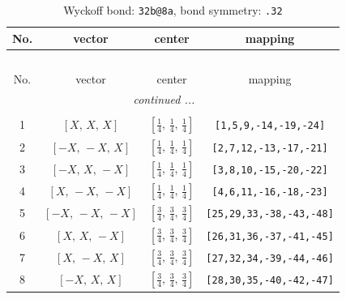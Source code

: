 \documentclass[fleqn,8pt]{jsarticle}
\begin{document}
\renewcommand{\arraystretch}{1.2}
\begin{longtable}{cccc}
\caption{Wyckoff bond: {\tt 32b@8a}, bond symmetry: {\tt .32}}
 \\
 \hline \hline
No. & vector & center & mapping \\ \hline \endfirsthead

\multicolumn{3}{l}{\tablename\ \thetable{}} \\
 \hline \hline
No. & vector & center & mapping \\ \hline \endhead

 \hline \hline
\multicolumn{3}{r}{\footnotesize\it continued ...} \\ \endfoot

 \hline \hline
\multicolumn{3}{r}{} \\ \endlastfoot

1 & $\left[ X,\, X,\, X \right]$ & $\left[ \frac{1}{4},\, \frac{1}{4},\, \frac{1}{4} \right]$ & {\tt [1,5,9,-14,-19,-24]} \\ \hline
2 & $\left[ - X,\, - X,\, X \right]$ & $\left[ \frac{1}{4},\, \frac{1}{4},\, \frac{1}{4} \right]$ & {\tt [2,7,12,-13,-17,-21]} \\ \hline
3 & $\left[ - X,\, X,\, - X \right]$ & $\left[ \frac{1}{4},\, \frac{1}{4},\, \frac{1}{4} \right]$ & {\tt [3,8,10,-15,-20,-22]} \\ \hline
4 & $\left[ X,\, - X,\, - X \right]$ & $\left[ \frac{1}{4},\, \frac{1}{4},\, \frac{1}{4} \right]$ & {\tt [4,6,11,-16,-18,-23]} \\ \hline
5 & $\left[ - X,\, - X,\, - X \right]$ & $\left[ \frac{3}{4},\, \frac{3}{4},\, \frac{3}{4} \right]$ & {\tt [25,29,33,-38,-43,-48]} \\ \hline
6 & $\left[ X,\, X,\, - X \right]$ & $\left[ \frac{3}{4},\, \frac{3}{4},\, \frac{3}{4} \right]$ & {\tt [26,31,36,-37,-41,-45]} \\ \hline
7 & $\left[ X,\, - X,\, X \right]$ & $\left[ \frac{3}{4},\, \frac{3}{4},\, \frac{3}{4} \right]$ & {\tt [27,32,34,-39,-44,-46]} \\ \hline
8 & $\left[ - X,\, X,\, X \right]$ & $\left[ \frac{3}{4},\, \frac{3}{4},\, \frac{3}{4} \right]$ & {\tt [28,30,35,-40,-42,-47]} \\
\end{longtable}
\renewcommand{\arraystretch}{1.2}
\end{document}
